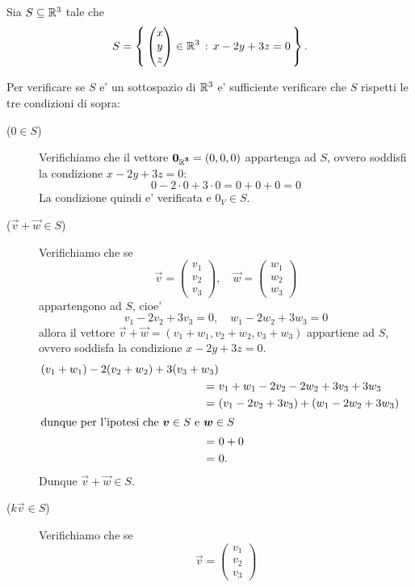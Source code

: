 \begin{example}
    Sia $S \subseteq \R^3$ tale che \[
        S = \set{ \begin{pmatrix}
            x \\ y \\ z
        \end{pmatrix} \in \R^3 \suchthat x -2y + 3z = 0}.
    \]

    Per verificare se $S$ e' un sottospazio di $\R^3$ e' sufficiente verificare che $S$ rispetti le tre condizioni di sopra:
    \begin{description}
        \item[($0 \in S$)] Verifichiamo che il vettore $\vec{0_{\R^3}} = (0, 0, 0)$ appartenga ad $S$, ovvero soddisfi la condizione $x -2y + 3z = 0$: \[
            0 -2\cdot 0 + 3 \cdot 0 = 0 + 0 + 0 = 0
        \] La condizione quindi e' verificata e $0_V \in S$.
        \item[($\vec v + \vec w \in S$)] Verifichiamo che se \[
            \vec v = \begin{pmatrix}
                v_1 \\ v_2 \\ v_3
            \end{pmatrix}, \quad \vec w = \begin{pmatrix}
                w_1 \\ w_2 \\ w_3
            \end{pmatrix} 
        \] appartengono ad $S$, cioe' \[
            v_1 - 2v_2 + 3v_3 = 0, \quad w_1 - 2w_2 + 3w_3 = 0
        \] allora il vettore $\vec{v} + \vec{w} = (v_1+w_1, v_2+w_2, v_3+w_3)$ appartiene ad $S$, ovvero soddisfa la condizione $x -2y + 3z = 0$. \begin{align*}
            (v_1+w_1) -2(v_2+w_2) + 3(v_3+w_3) \\
            =\ &v_1+w_1 -2v_2-2w_2 + 3v_3+3w_3 \\
            =\ &(v_1 -2v_2 +3v_3) + (w_1 -2w_2 +3w_3)\\
            \intertext{dunque per l'ipotesi che $\vec v \in S$ e $\vec w \in S$}
            =\ &0 + 0\\
            =\ &0.
        \end{align*}
        Dunque $\vec v + \vec w \in S$.
        \item[($k\vec v  \in S$)] Verifichiamo che se \[
            \vec v = \begin{pmatrix}
                v_1 \\ v_2 \\ v_3

\end{pmatrix}\]
\end{description}
\end{example}
